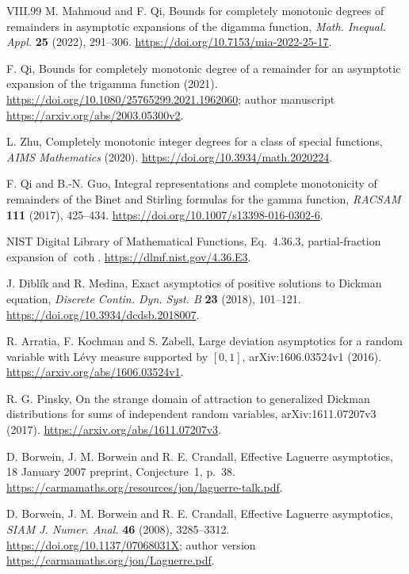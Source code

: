 \documentclass[11pt,a4paper]{article}
\theoremstyle{definition}
\theoremstyle{remark}
\numberwithin{equation}{section}
\begin{document}
\begin{thebibliography}{VIII.99}
M. Mahmoud and F. Qi, Bounds for completely monotonic degrees of
remainders in asymptotic expansions of the digamma function,
\emph{Math. Inequal. Appl.} \textbf{25} (2022), 291--306.
\url{https://doi.org/10.7153/mia-2022-25-17}.

F. Qi, Bounds for completely monotonic degree of a remainder for an
asymptotic expansion of the trigamma function (2021).
\url{https://doi.org/10.1080/25765299.2021.1962060};
author manuscript \url{https://arxiv.org/abs/2003.05300v2}.

L. Zhu, Completely monotonic integer degrees for a class of special
functions, \emph{AIMS Mathematics} (2020).
\url{https://doi.org/10.3934/math.2020224}.

F. Qi and B.-N. Guo, Integral representations and complete monotonicity
of remainders of the Binet and Stirling formulas for the gamma function,
\emph{RACSAM} \textbf{111} (2017), 425--434.
\url{https://doi.org/10.1007/s13398-016-0302-6}.

NIST Digital Library of Mathematical Functions, Eq.~4.36.3,
partial-fraction expansion of $\coth$.
\url{https://dlmf.nist.gov/4.36.E3}.

J. Dibl\'ik and R. Medina, Exact asymptotics of positive solutions to
Dickman equation, \emph{Discrete Contin. Dyn. Syst. B}
\textbf{23} (2018), 101--121.
\url{https://doi.org/10.3934/dcdsb.2018007}.

R. Arratia, F. Kochman and S. Zabell, Large deviation asymptotics for a
random variable with L\'evy measure supported by $[0,1]$,
arXiv:1606.03524v1 (2016).
\url{https://arxiv.org/abs/1606.03524v1}.

R. G. Pinsky, On the strange domain of attraction to generalized Dickman
distributions for sums of independent random variables,
arXiv:1611.07207v3 (2017).
\url{https://arxiv.org/abs/1611.07207v3}.

D. Borwein, J. M. Borwein and R. E. Crandall, Effective Laguerre
asymptotics, 18 January 2007 preprint, Conjecture~1, p.~38.
\url{https://carmamaths.org/resources/jon/laguerre-talk.pdf}.

D. Borwein, J. M. Borwein and R. E. Crandall, Effective Laguerre
asymptotics, \emph{SIAM J. Numer. Anal.} \textbf{46} (2008), 3285--3312.
\url{https://doi.org/10.1137/07068031X}; author version
\url{https://carmamaths.org/jon/Laguerre.pdf}.


\end{thebibliography}
\end{document}
